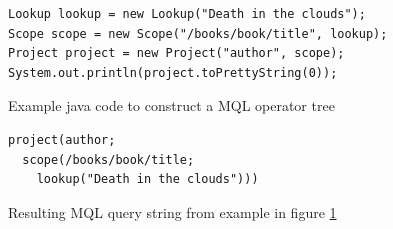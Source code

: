 \begin{figure}[htp]
\begin{center}
  \begin{Verbatim}
Lookup lookup = new Lookup("Death in the clouds");
Scope scope = new Scope("/books/book/title", lookup);
Project project = new Project("author", scope);
System.out.println(project.toPrettyString(0));
  \end{Verbatim}
  \caption{Example java code to construct a MQL operator tree}
  \label{fig:impl:mql_op_ex1_java}
\end{center}
\end{figure}

\begin{figure}[htp]
\begin{center}
  \begin{Verbatim}
project(author;
  scope(/books/book/title;
    lookup("Death in the clouds")))
  \end{Verbatim}
  \caption{Resulting MQL query string from example in figure
  \ref{fig:impl:mql_op_ex1_java}}
  \label{fig:impl:mql_op_ex1_mql}
\end{center}
\end{figure}
